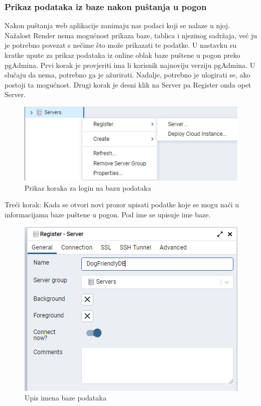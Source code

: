       \subsubsection{Prikaz podataka iz baze nakon puštanja u pogon}

        Nakon puštanja web aplikacije zanimaju nas podaci koji se nalaze u njoj. Nažalost Render nema mogućnost prikaza baze, tablica i njezinog sadržaja, već ju je potrebno povezat s nečime što može prikazati te podatke. U nastavku su kratke upute za prikaz podataka iz online oblak baze puštene u pogon preko pgAdmina.
        Prvi korak je provjeriti ima li korisnik najnoviju verziju pgAdmina. U slučaju da nema, potrebno ga je ažurirati.
        Nadalje, potrebno je ulogirati se, ako postoji ta mogućnost.
        Drugi korak je desni klik na Server pa Register onda opet Server.
        \begin{figure}[H]
			    \includegraphics[width=\textwidth]{slike/baza1.png} 
			        \caption{Prikaz koraka za login na bazu podataka}
			    \label{fig:Prikaz koraka za login na bazu podataka}
		    \end{figure}
        Treći korak:
        Kada se otvori novi prozor upisati podatke koje se mogu naći u informacijama baze puštene u pogon.
        Pod ime se upisuje ime baze.
        \begin{figure}[H]
			    \includegraphics[width=\textwidth]{slike/baza2.png} 
			        \caption{Upis imena baze podataka}
			    \label{fig:Upis imena baze podataka}
		    \end{figure}
